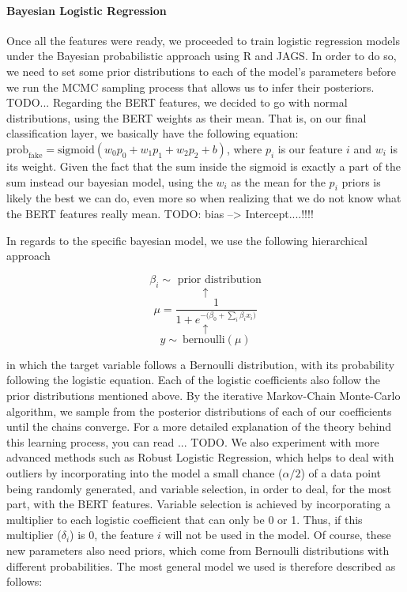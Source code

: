 \documentclass[man, floatsintext, 10pt]{apa6}
\begin{document}
\vspace{2mm}

\paragraph{Bayesian Logistic Regression} Once all the features were ready, we proceeded to train logistic regression models under the Bayesian probabilistic approach using R and JAGS. In order to do so, we need to set some prior distributions to each of the model's parameters before we run the MCMC sampling process that allows us to infer their posteriors. TODO... Regarding the BERT features, we decided to go with normal distributions, using the BERT weights as their mean. That is, on our final classification layer, we basically have the following equation: $\text{prob}_{\text{fake}} = \text{sigmoid} (w_0 p_0 + w_1 p_1 + w_2 p_2 + b)$, where $p_i$ is our feature $i$ and $w_i$ is its weight. Given the fact that the sum inside the sigmoid is exactly a part of the sum instead our bayesian model, using the $w_i$ as the mean for the $p_i$ priors is likely the best we can do, even more so when realizing that we do not know what the BERT features really mean. TODO: bias --> Intercept....!!!!

In regards to the specific bayesian model, we use the following hierarchical approach 

\[\beta_i \sim \text{ prior distribution} \] \[ \uparrow \] \[ \mu = \frac{1}{1 + e^{-\big(\beta_0 + \sum_i \beta_i x_i \big)}} \] \vspace{0.01mm}  \[ \uparrow \] \[ y \sim\ \text{bernoulli} (\mu) \]

in which the target variable follows a Bernoulli distribution, with its probability following the logistic equation. Each of the logistic coefficients also follow the prior distributions mentioned above. By the iterative Markov-Chain Monte-Carlo algorithm, we sample from the posterior distributions of each of our coefficients until the chains converge. For a more detailed explanation of the theory behind this learning process, you can read ... TODO.  We also experiment with more advanced methods such as Robust Logistic Regression, which helps to deal with outliers by incorporating into the model a small chance ($\alpha/2$) of a data point being randomly generated, and variable selection, in order to deal, for the most part, with the BERT features. Variable selection is achieved by incorporating a multiplier to each logistic coefficient that can only be 0 or 1. Thus, if this multiplier ($\delta_i$) is 0, the feature $i$ will not be used in the model. Of course, these new parameters also need priors, which come from Bernoulli distributions with different probabilities. The most general model we used is therefore described as follows:
\end{document}
